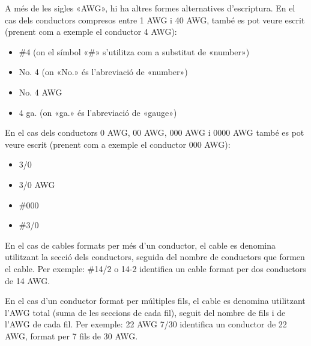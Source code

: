 A més de les sigles «AWG», hi ha altres formes alternatives d'escriptura. En el cas dels conductors compresos entre 1 AWG i 40 AWG, també es pot veure escrit (prenent com a exemple el conductor 4 AWG):
\begin{itemize}
   \item \#4 (on el símbol «\#» s'utilitza com a substitut de «number»)
   \item No. 4 (on «No.» és l'abreviació de «number»)
   \item No. 4 AWG
   \item 4 ga. (on «ga.» és l'abreviació de «gauge»)
\end{itemize}

En el cas dels conductors 0 AWG, 00 AWG, 000 AWG i 0000 AWG també es pot veure escrit (prenent com a exemple el conductor 000 AWG):
\begin{itemize}
   \item 3/0
   \item 3/0 AWG
   \item \#000
   \item \#3/0
\end{itemize}


En el cas de cables formats per més d'un conductor, el cable es denomina utilitzant la secció dels conductors, seguida del nombre de conductors que formen el cable. Per exemple: \#14/2 o 14-2 identifica un cable format per dos conductors de 14 AWG.

En el cas d'un conductor format per múltiples fils, el cable es denomina utilitzant l'AWG total (suma de les seccions de cada fil), seguit del nombre de fils i de l'AWG de cada fil. Per exemple: 22 AWG 7/30 identifica un conductor de 22 AWG, format per 7 fils de  30 AWG.

